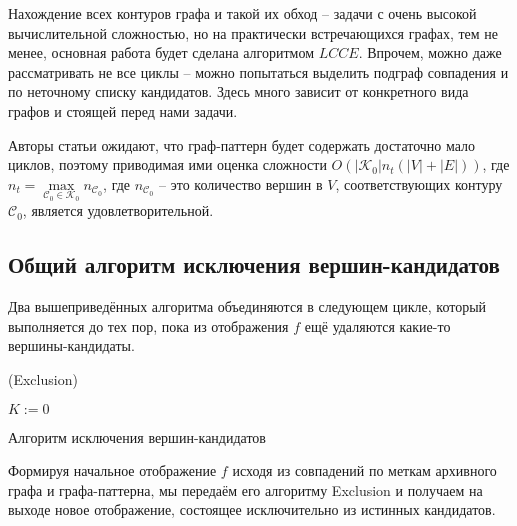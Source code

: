 Нахождение всех контуров графа и такой их обход -- задачи с очень высокой вычислительной сложностью, но на практически встречающихся графах, тем не менее, основная работа будет сделана алгоритмом $LCCE$. Впрочем, можно даже рассматривать не все циклы -- можно попытаться выделить подграф совпадения и по неточному списку кандидатов. Здесь много зависит от конкретного вида графов и стоящей перед нами задачи.

Авторы статьи \cite{patmat} ожидают, что граф-паттерн будет содержать достаточно мало циклов, поэтому приводимая ими оценка сложности $O(|\mathcal{K}_0|n_t(|V| + |E|))$, где $n_t = \max\limits_{\mathcal{C}_0 \in \mathcal{K}_0} n_{\mathcal{C}_0}$, где $n_{\mathcal{C}_0}$ -- это количество вершин в $V$, соответствующих контуру $\mathcal{C}_0$, является удовлетворительной.

\subsection{Общий алгоритм исключения вершин-кандидатов}

Два вышеприведённых алгоритма объединяются в следующем цикле, который выполняется до тех пор, пока из отображения $f$ ещё удаляются какие-то вершины-кандидаты.

\begin{algorithm}
	\Large
	\Begin(Exclusion){
		$K := 0$
		
	}

	\caption{Алгоритм исключения вершин-кандидатов}
	\label{alg:EE}
\end{algorithm}

Формируя начальное отображение $f$ исходя из совпадений по меткам архивного графа и графа-паттерна, мы передаём его алгоритму Exclusion и получаем на выходе новое отображение, состоящее исключительно из истинных кандидатов.
